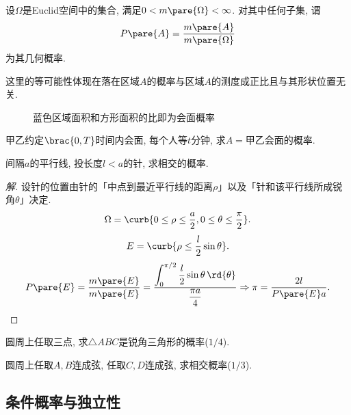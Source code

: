 \documentclass{ctexart}
\begin{document}
\begin{definition}
    设$\Omega$是Euclid空间中的集合, 满足$0 < m\pare{\Omega} < \infty$. 对其中任何子集, 谓
    \[ P\pare{A} = \frac{m\pare{A}}{m\pare{\Omega}} \]
    为其几何概率.
\end{definition}
\begin{remark}
    这里的等可能性体现在落在区域$A$的概率与区域$A$的测度成正比且与其形状位置无关.
\end{remark}
\begin{figure}[ht]
    \centering
    \caption{蓝色区域面积和方形面积的比即为会面概率}
\end{figure}
\begin{sample}
    \begin{ex}
        甲乙约定$\brac{0,T}$时间内会面, 每个人等$t$分钟, 求$A=$甲乙会面的概率.
    \end{ex}
\end{sample}
\begin{sample}
    \begin{ex}[Buffon投针实验]
        间隔$a$的平行线, 投长度$l<a$的针, 求相交的概率.
    \end{ex}
    \begin{proof}[解]
        设针的位置由针的「中点到最近平行线的距离$\rho$」以及「针和该平行线所成锐角$\theta$」决定.
        \[ \Omega = \curb{0 \le \rho \le \frac{a}{2}, 0 \le \theta \le \frac{\pi}{2}}. \]
        \[ E = \curb{\rho \le \frac{l}{2}\sin\theta}. \]
        \[ P\pare{E} = \frac{m\pare{E}}{m\pare{E}} = \frac{\displaystyle\int_0^{\pi/2}\frac{l}{2}\sin\theta\,\rd{\theta}}{\displaystyle\frac{\pi a}{4}}\Rightarrow \pi = \frac{2l}{P\pare{E}a}. \qedhere \]
    \end{proof}
\end{sample}
\begin{sample}
    \begin{ex}
        圆周上任取三点, 求$\bigtriangleup ABC$是锐角三角形的概率($1/4$).
    \end{ex}
    \begin{ex}
        圆周上任取$A,B$连成弦, 任取$C,D$连成弦, 求相交概率($1/3$).
    \end{ex}
\end{sample}


\subsection{条件概率与独立性} %
\label{sub:条件概率与独立性}
\end{document}
